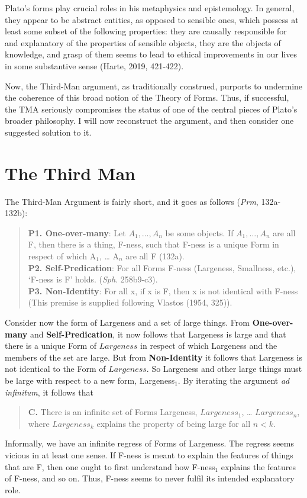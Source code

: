 \documentclass [article] {memoir}
\begin{document}
Plato's forms play crucial roles in his metaphysics and epistemology. In general, they appear to be abstract entities, as opposed to sensible ones, which possess at least some subset of the following properties: they are causally responsible for and explanatory of the properties of sensible objects, they are the objects of knowledge, and grasp of them seems to lead to ethical improvements in our lives in some substantive sense (Harte, 2019, 421-422). 

Now, the Third-Man argument, as traditionally construed, purports to undermine the coherence of this broad notion of the Theory of Forms. Thus, if successful, the TMA seriously compromises the status of one of the central pieces of Plato's broader philosophy. I will now reconstruct the argument, and then consider one suggested solution to it. 
\chapter{The Third Man}
The Third-Man Argument is fairly short, and it goes as follows (\textit{Prm}, 132a-132b):
\begin{quote}
\textbf{P1. One-over-many}: Let $A_1, \dots , A_n$ be some objects. If $A_1, \dots, A_n$ are all F, then there is a thing, F-ness, such that F-ness is a unique Form in respect of which A$_1$, … A$_n$ are all F (132a). \\
\textbf{P2. Self-Predication}: For all Forms F-ness (Largeness, Smallness, etc.), `F-ness is F' holds. (\textit{Sph}. 258b9-c3). \\
\textbf{P3. Non-Identity}: For all x, if x is F, then x is not identical with F-ness (This premise is supplied following Vlastos (1954, 325)).
\end{quote}
Consider now the form of Largeness and a set of large things. From \textbf{One-over-many} and \textbf{Self-Predication}, it now follows that Largeness is large and that there is a unique Form of $Largeness$ in respect of which Largeness and the members of the set are large. But from \textbf{Non-Identity} it follows that Largeness is not identical to the Form of $Largeness$. So Largeness and other large things must be large with respect to a new form, Largeness$_1$. By iterating the argument \textit{ad infinitum}, it follows that
\begin{quote}
\textbf{C.} There is an infinite set of Forms {Largeness, $Largeness_1$, … $Largeness_n$}, where $Largeness_k$ explains the property of being large for all $n<k$. 
\end{quote}
Informally, we have an infinite regress of Forms of Largeness. The regress seems vicious in at least one sense. If F-ness is meant to explain the features of things that are F, then one ought to first understand how F-ness$_1$ explains the features of F-ness, and so on. Thus, F-ness seems to never fulfil its intended explanatory role. 
\end{document}
